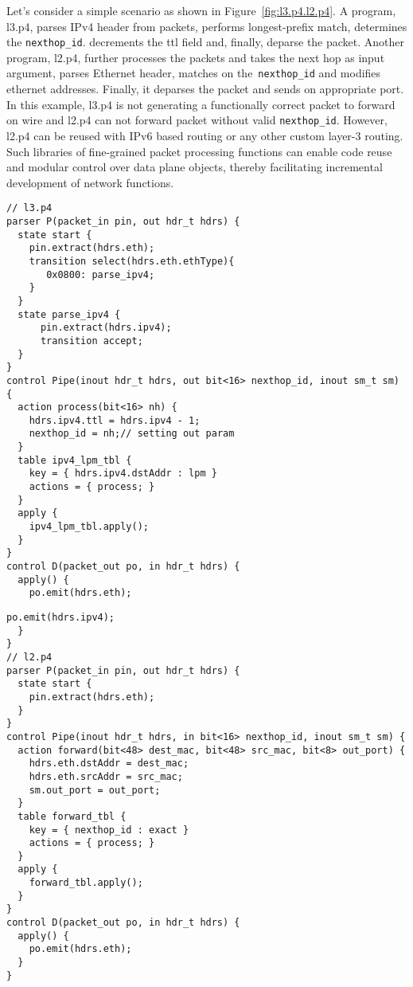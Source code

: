 Let's consider a simple scenario as shown in Figure~\ref{fig:l3.p4.l2.p4}. A program, l3.p4, parses IPv4 header from packets, performs longest-prefix match, determines the \texttt{nexthop\_id}. decrements the ttl field and, finally, deparse the packet. 
Another program, l2.p4, further processes the packets and takes the next hop as input argument, parses Ethernet header, matches on the~\texttt{nexthop\_id} and modifies ethernet addresses.
Finally, it deparses the packet and sends on appropriate port.
In this example, l3.p4 is not generating a functionally correct packet to forward on wire and l2.p4 can not forward packet without valid \texttt{nexthop\_id}. 
However, l2.p4 can be reused with IPv6 based routing or any other custom layer-3 routing.
Such libraries of fine-grained packet processing functions can enable code reuse and modular control over data plane objects, thereby facilitating incremental development of network functions. 

\begin{figure*}[ht]
\noindent \begin{minipage}[t]{.48\textwidth}
\begin{lstlisting}[frame=none]
// l3.p4
parser P(packet_in pin, out hdr_t hdrs) {
  state start {
    pin.extract(hdrs.eth);
    transition select(hdrs.eth.ethType){
       0x0800: parse_ipv4;
    }
  }
  state parse_ipv4 {
      pin.extract(hdrs.ipv4);
      transition accept;
  }
}
control Pipe(inout hdr_t hdrs, out bit<16> nexthop_id, inout sm_t sm) {
  action process(bit<16> nh) {
    hdrs.ipv4.ttl = hdrs.ipv4 - 1;
    nexthop_id = nh;// setting out param
  }
  table ipv4_lpm_tbl {
    key = { hdrs.ipv4.dstAddr : lpm } 
    actions = { process; }
  }
  apply {
    ipv4_lpm_tbl.apply();
  }
}
control D(packet_out po, in hdr_t hdrs) {
  apply() {
    po.emit(hdrs.eth);
\end{lstlisting}
\end{minipage}
\hfill\begin{minipage}[t]{.48\textwidth}
\begin{lstlisting}[frame=none]
    po.emit(hdrs.ipv4);
  }
}
// l2.p4
parser P(packet_in pin, out hdr_t hdrs) {
  state start {
    pin.extract(hdrs.eth);
  }
}
control Pipe(inout hdr_t hdrs, in bit<16> nexthop_id, inout sm_t sm) {
  action forward(bit<48> dest_mac, bit<48> src_mac, bit<8> out_port) {
    hdrs.eth.dstAddr = dest_mac;
    hdrs.eth.srcAddr = src_mac;
    sm.out_port = out_port;    
  }
  table forward_tbl {
    key = { nexthop_id : exact } 
    actions = { process; }
  }
  apply {
    forward_tbl.apply();
  }
}
control D(packet_out po, in hdr_t hdrs) {
  apply() {
    po.emit(hdrs.eth);
  }
}
\end{lstlisting}
\end{minipage}
\caption{Fine-grained packet processing modules - l3.p4  and l2.p4}
\label{fig:l3.p4.l2.p4}
\end{figure*}

